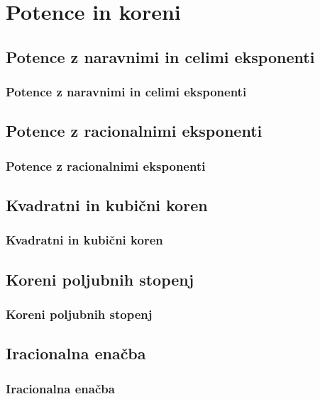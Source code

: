 \section{Potence in koreni}

\begin{frame}
    \sectionpage
\end{frame}

\begin{frame}
\end{frame}

    \subsection{Potence z naravnimi in celimi eksponenti}

        \begin{frame}
            \frametitle{Potence z naravnimi in celimi eksponenti}
        \end{frame}

    \subsection{Potence z racionalnimi eksponenti}

        \begin{frame}
            \frametitle{Potence z racionalnimi eksponenti}
        \end{frame}

    \subsection{Kvadratni in kubični koren}

        \begin{frame}
            \frametitle{Kvadratni in kubični koren}
        \end{frame}

    \subsection{Koreni poljubnih stopenj}

        \begin{frame}
            \frametitle{Koreni poljubnih stopenj}
        \end{frame}

    \subsection{Iracionalna enačba}

        \begin{frame}
            \frametitle{Iracionalna enačba}
        \end{frame}

